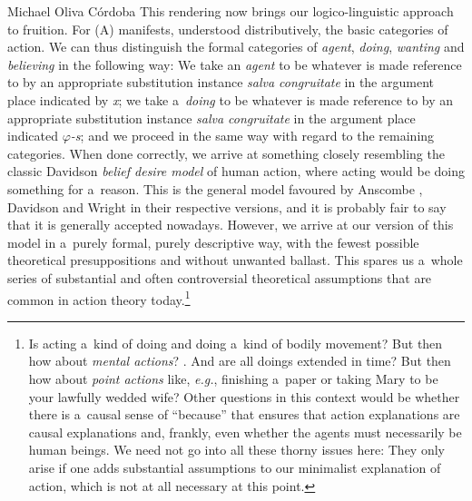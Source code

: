 \begin{artengenv}{Michael Oliva Córdoba}
This rendering now brings our logico-linguistic approach to fruition. For (A) manifests, understood distributively, the basic categories of action. We can thus distinguish the formal categories of \textit{agent}, \textit{doing}, \textit{wanting} and \textit{believing} in the following way: We take an \textit{agent} to be whatever is made reference to by an appropriate substitution instance \textit{salva congruitate} in the argument place indicated by \textlquill\textit{x}\textrquill; we take a~\textit{doing} to be whatever is made reference to by an appropriate substitution instance \textit{salva congruitate} in the argument place indicated \textlquill\textit{$\varphi $-s}\textrquill; and we proceed in the same way with regard to the remaining categories. When done correctly, we arrive at something closely resembling the classic Davidson \textit{belief desire model} of human action, where acting would be doing something for a~reason. This is the general model favoured by Anscombe 
\parencite*[][]{anscombe_intention_1957}, %
 Davidson 
\parencite*[][]{davidson_1963} %
 and Wright 
\parencite*[][]{wright_explanation_1971} %
 in their respective versions, and it is probably fair to say that it is generally accepted nowadays. However, we arrive at our version of this model in a~purely formal, purely descriptive way, with the fewest possible theoretical presuppositions and without unwanted ballast. This spares us a~whole series of substantial and often controversial theoretical assumptions that are common in action theory today.\footnote{Is acting a~kind of doing and doing a~kind of bodily movement? But then how about \textit{mental actions}? 
\parencite[cf., e.g.,][]{obrien_mental_2009}. %
 And are all doings extended in time? 
\parencite[][p.158]{frankfurt_problem_1978} %
 But then how about \textit{point actions} like, \textit{e.g.}, finishing a~paper or taking Mary to be your lawfully wedded wife? Other questions in this context would be whether there is a~causal sense of ``because'' that ensures that action explanations are causal explanations 
\parencite[cf.][]{davidson_1963} %
 and, frankly, even whether the agents must necessarily be human beings. We need not go into all these thorny issues here: They only arise if one adds substantial assumptions to our minimalist explanation of action, which is not at all necessary at this point. }




\end{artengenv}
